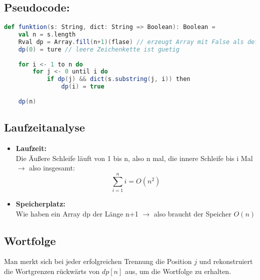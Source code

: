 \subsection{Pseudocode:}
\begin{lstlisting}[language=Scala]
def funktion(s: String, dict: String => Boolean): Boolean =
	val n = s.length
	Rval dp = Array.fill(n+1)(flase) // erzeugt Array mit False als default Value
	dp(0) = ture // leere Zeichenkette ist guetig
	
	for i <- 1 to n do
		for j <- 0 until i do
			if dp(j) && dict(s.substring(j, i)) then
				dp(i) = true
				
	dp(n)
\end{lstlisting}

\subsection{Laufzeitanalyse}

\begin{itemize}
	\item \textbf{Laufzeit:}\\
	Die Äußere Schleife läuft von 1 bis n, also n mal, die innere Schleife bis i Mal $\rightarrow$ also insgesamt:
	$$\sum_{i=1}^{n}i = O(n^2)$$
	
	\item \textbf{Speicherplatz:}\\ 
	Wie haben ein Array dp der Länge n+1 $\rightarrow$ also braucht der Speicher  $O(n)$
\end{itemize}

\subsection{Wortfolge}

Man merkt sich bei jeder erfolgreichen Trennung die Position $j$ und rekonstruiert die Wortgrenzen rückwärts von $dp[n]$ aus, um die Wortfolge zu erhalten.